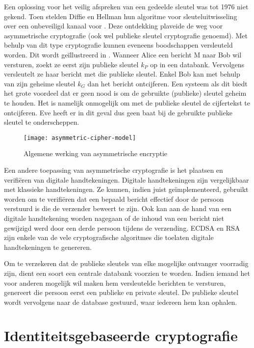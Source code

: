 Een oplossing voor het veilig afspreken van een gedeelde sleutel was tot 1976 niet gekend. Toen stelden Diffie en Hellman hun algoritme voor sleuteluitwisseling over een onbeveiligd kanaal voor \cite{diffie-hellman}. Deze ontdekking plaveide de weg voor asymmetrische cryptografie (ook wel publieke sleutel cryptografie genoemd). Met behulp van dit type cryptografie kunnen eveneens boodschappen versleuteld worden. Dit wordt ge\"illustreerd in . Wanneer Alice een bericht M naar Bob wil versturen, zoekt ze eerst zijn publieke sleutel $k_P$ op in een databank. Vervolgens versleutelt ze haar bericht met die publieke sleutel. Enkel Bob kan met behulp van zijn geheime sleutel $k_G$ dan het bericht ontcijferen. Een systeem als dit biedt het grote voordeel dat er geen nood is om de gebruikte (publieke) sleutel geheim te houden. Het is namelijk onmogelijk om met de publieke sleutel de cijfertekst te ontcijferen. Eve heeft er in dit geval dus geen baat bij de gebruikte publieke sleutel te onderscheppen. 

\begin{figure}[h]
	\centering
		 \texttt{[image: asymmetric-cipher-model]}
		 \caption{Algemene werking van asymmetrische encryptie\label{fig-encryptie-applicaties-asym-cipher}}
\end{figure}

Een andere toepassing van asymmetrische cryptografie is het plaatsen en verifi\"eren van digitale handtekeningen. Digitale handtekeningen zijn vergelijkbaar met klassieke handtekeningen. Ze kunnen, indien juist ge\-\"im\-ple\-men\-teerd, gebruikt worden om te verifi\"eren dat een bepaald bericht effectief door de persoon verstuurd is die de verzender beweert te zijn. Ook kan aan de hand van een digitale handtekening worden nagegaan of de inhoud van een bericht niet gewijzigd werd door een derde persoon tijdens de verzending. ECDSA \cite{ecdsa} en RSA \cite{rsa} zijn enkele van de vele cryptografische algoritmes die toelaten digitale handtekeningen te genereren.

Om te verzekeren dat de publieke sleutels van elke mogelijke ontvanger voorradig zijn, dient een soort een centrale databank voorzien te worden. Indien iemand het voor anderen mogelijk wil maken hem versleutelde berichten te versturen, genereert die persoon eerst een publieke en private sleutel. De publieke sleutel wordt vervolgens naar de database gestuurd, waar iedereen hem kan ophalen.

\section{Identiteitsgebaseerde cryptografie}

